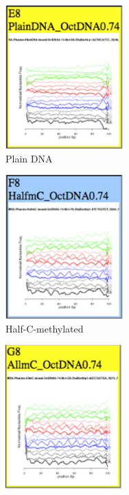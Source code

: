 \documentclass[parskip=full, numbers=noenddot]{scrreprt}
\begin{document}
\begin{figure}[htpb]
  \centering
  \begin{subfigure}[htpb]{0.5\textwidth}
    \centering
    \includegraphics[width=0.5\textwidth]{emsa_e8_counts}
    \caption{Plain DNA}
    \label{fig:freqplots_e8}
  \end{subfigure}
  \begin{subfigure}[htpb]{0.5\textwidth}
    \centering
    \includegraphics[width=0.5\textwidth]{emsa_f8_counts}
    \caption{Half-C-methylated}
    \label{fig:freqplots_f8}
  \end{subfigure}
  \begin{subfigure}[htpb]{0.5\textwidth}
    \centering
    \includegraphics[width=0.5\textwidth]{emsa_g8_counts}

\end{subfigure}
\end{figure}
\end{document}
